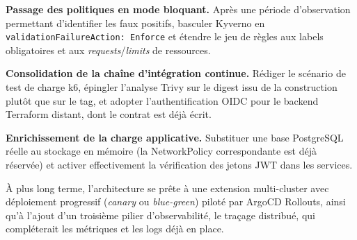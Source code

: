 \documentclass[12pt,a4paper,twoside,openright]{report}
\makeatletter
\def\cleardoublepage{\clearpage\if@twoside
  \ifodd\c@page\else\hbox{}\thispagestyle{empty}\newpage\fi\fi}
\makeatother
\begin{document}
\textbf{Passage des politiques en mode bloquant.} Après une période d'observation
permettant d'identifier les faux positifs, basculer Kyverno en
\texttt{validationFailureAction: Enforce} et étendre le jeu de règles aux labels
obligatoires et aux \emph{requests}/\emph{limits} de ressources.

\textbf{Consolidation de la chaîne d'intégration continue.} Rédiger le scénario de
test de charge k6, épingler l'analyse Trivy sur le digest issu de la construction
plutôt que sur le tag, et adopter l'authentification OIDC pour le backend Terraform
distant, dont le contrat est déjà écrit.

\textbf{Enrichissement de la charge applicative.} Substituer une base PostgreSQL réelle
au stockage en mémoire (la NetworkPolicy correspondante est déjà réservée) et
activer effectivement la vérification des jetons JWT dans les services.

À plus long terme, l'architecture se prête à une extension multi-cluster avec
déploiement progressif (\emph{canary} ou \emph{blue-green}) piloté par ArgoCD Rollouts,
ainsi qu'à l'ajout d'un troisième pilier d'observabilité, le traçage distribué, qui
compléterait les métriques et les logs déjà en place.

\cleardoublepage
\end{document}
